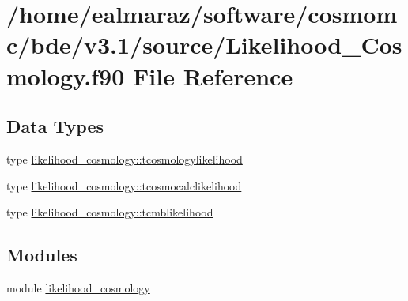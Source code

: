 \hypertarget{Likelihood__Cosmology_8f90}{}\section{/home/ealmaraz/software/cosmomc/bde/v3.1/source/\+Likelihood\+\_\+\+Cosmology.f90 File Reference}
\label{Likelihood__Cosmology_8f90}
\subsection*{Data Types}
\begin{DoxyCompactItemize}
\item 
type \mbox{\hyperlink{structlikelihood__cosmology_1_1tcosmologylikelihood}{likelihood\+\_\+cosmology\+::tcosmologylikelihood}}
\item 
type \mbox{\hyperlink{structlikelihood__cosmology_1_1tcosmocalclikelihood}{likelihood\+\_\+cosmology\+::tcosmocalclikelihood}}
\item 
type \mbox{\hyperlink{structlikelihood__cosmology_1_1tcmblikelihood}{likelihood\+\_\+cosmology\+::tcmblikelihood}}
\end{DoxyCompactItemize}
\subsection*{Modules}
\begin{DoxyCompactItemize}
\item 
module \mbox{\hyperlink{namespacelikelihood__cosmology}{likelihood\+\_\+cosmology}}
\end{DoxyCompactItemize}
